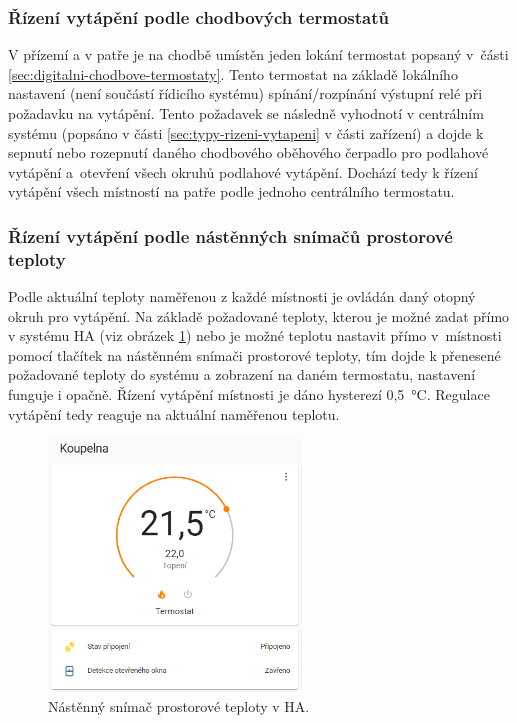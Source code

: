 \subsubsection{Řízení vytápění podle chodbových termostatů}
V přízemí a v patře je na chodbě umístěn jeden lokání termostat popsaný v~části \ref{sec:digitalni-chodbove-termostaty}. Tento termostat na základě lokálního nastavení (není součástí řídicího systému) spínání/rozpínání výstupní relé při požadavku na vytápění. Tento požadavek se následně vyhodnotí v centrálním systému (popsáno v části \ref{sec:typy-rizeni-vytapeni} v části zařízení) a dojde k sepnutí nebo rozepnutí daného chodbového oběhového čerpadlo pro podlahové vytápění a~otevření všech okruhů podlahové vytápění. Dochází tedy k řízení vytápění všech místností na patře podle jednoho centrálního termostatu. 

\subsubsection{Řízení vytápění podle nástěnných snímačů prostorové teploty}
\label{sec:rizeni-vytapeni-podle-nastennych-snimacu-prostorove-teploty}
Podle aktuální teploty naměřenou z každé místnosti je ovládán daný otopný okruh pro vytápění. Na základě požadované teploty, kterou je možné zadat přímo v systému HA (viz obrázek \ref{fig:lokalni-termostat-ha}) nebo je možné teplotu nastavit přímo v~místnosti pomocí tlačítek na nástěnném snímači prostorové teploty, tím dojde k přenesené požadované teploty do systému a zobrazení na daném termostatu, nastavení funguje i opačně. Řízení vytápění místnosti je dáno hysterezí 0,5~°C. Regulace vytápění tedy reaguje na aktuální naměřenou teplotu.

\begin{figure}[H]
    \centering
    \includegraphics[width=0.6\textwidth]{images/software-ha/lokalni-termostat-ha.png}
    \caption{Nástěnný snímač prostorové teploty v HA.}
    \label{fig:lokalni-termostat-ha}
\end{figure}

